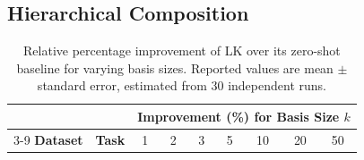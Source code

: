 \documentclass{article}
\theoremstyle{plain}
\theoremstyle{definition}
\theoremstyle{remark}
\begin{document}
\newpage
\subsection{Hierarchical Composition}
\label{sec:hier-comp-appendix}

\begin{table}[H]
\centering
\caption{Relative percentage improvement of LK over its zero-shot baseline for varying basis sizes. Reported values are mean $\pm$ standard error, estimated from 30 independent runs.}
\label{tab:perc_imp_fb_lk_appendix}

\setlength{\tabcolsep}{5pt}
\renewcommand{\arraystretch}{1.1}
\footnotesize

\begin{tabular}{l l r r r r r r r}
\toprule
 & & \multicolumn{7}{c}{\textbf{Improvement (\%) for Basis Size $k$}} \\
\cmidrule(lr){3-9}
\textbf{Dataset} & \textbf{Task}
& \multicolumn{1}{c}{1}
& \multicolumn{1}{c}{2}
& \multicolumn{1}{c}{3}
& \multicolumn{1}{c}{5}
& \multicolumn{1}{c}{10}
& \multicolumn{1}{c}{20}
& \multicolumn{1}{c}{50} \\
\midrule


\end{tabular}
\end{table}
\end{document}

